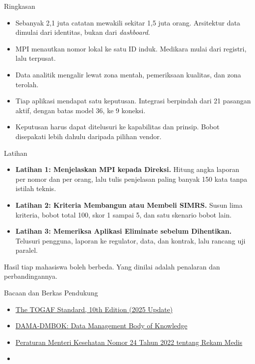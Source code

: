 \documentclass[aspectratio=169, table, 12pt]{beamer}
\begin{document}
\begin{frame}{{\Large Ringkasan}}
  \small
  \vspace{6pt}
  \begin{itemize}
    \item Sebanyak 2,1 juta catatan mewakili sekitar 1,5 juta orang. Arsitektur data dimulai dari
          identitas, bukan dari \textit{dashboard}.
    \item MPI menautkan nomor lokal ke satu ID induk. Medikara mulai dari registri, lalu terpusat.
    \item Data analitik mengalir lewat zona mentah, pemeriksaan kualitas, dan zona terolah.
    \item Tiap aplikasi mendapat satu keputusan. Integrasi berpindah dari 21 pasangan aktif, dengan batas
          model 36, ke 9 koneksi.
    \item Keputusan harus dapat ditelusuri ke kapabilitas dan prinsip. Bobot disepakati lebih dahulu
          daripada pilihan vendor.
  \end{itemize}
\end{frame}

\begin{frame}{{\Large Latihan}}
  \small
  \vspace{6pt}
  \begin{itemize}
    \item \textbf{Latihan 1: Menjelaskan MPI kepada Direksi.} Hitung angka laporan per nomor dan per
          orang, lalu tulis penjelasan paling banyak 150 kata tanpa istilah teknis.
    \item \textbf{Latihan 2: Kriteria Membangun atau Membeli SIMRS.} Susun lima kriteria, bobot total
          100, skor 1 sampai 5, dan satu skenario bobot lain.
    \item \textbf{Latihan 3: Memeriksa Aplikasi Eliminate sebelum Dihentikan.} Telusuri pengguna,
          laporan ke regulator, data, dan kontrak, lalu rancang uji paralel.
  \end{itemize}
  \vspace{6pt}
  Hasil tiap mahasiswa boleh berbeda. Yang dinilai adalah penalaran dan perbandingannya.
\end{frame}

\begin{frame}{{\Large Bacaan dan Berkas Pendukung}}
  \small
  \vspace{6pt}
  \begin{itemize}
    \item \href{https://www.opengroup.org/togaf}{The TOGAF Standard, 10th Edition (2025 Update)}
    \item \href{https://dama.org/articles/introducing-the-revised-dama-data-management-body-of-knowledge-2nd-edition}{DAMA-DMBOK: Data Management Body of Knowledge}
    \item \href{https://peraturan.bpk.go.id/Details/245544}{Peraturan Menteri Kesehatan Nomor 24 Tahun 2022 tentang Rekam Medis}
    \item {}
  \end{itemize}
\end{frame}
\end{document}
